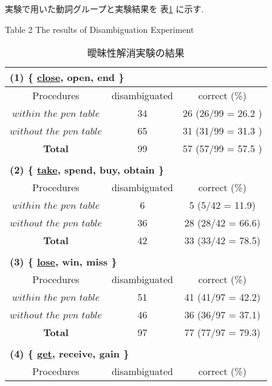 実験で用いた動詞グループと実験結果を 表\ref{disam} に示す.

\vspace*{-0.6cm}
{\footnotesize
\begin{table}[htbp]
\begin{center}
\caption{曖昧性解消実験の結果} \label{disam}
\vspace*{-0.2cm}
Table 2 The results of Disambiguation Experiment \\
\begin{tabular}{c||c|c} 
\multicolumn{3}{l}{\bf{(1) \{ \underline{close}, open, end \}}} \\
\hline \hline
Procedures  &disambiguated &correct (\%)  \\ \hline \hline
$within$ $the$ $pvn$ $table$ &\hspace*{1mm}34  &26 (26/99 = 26.2 ) \\ \hline
$without$ $the$ $pvn$ $table$ &65  &31 (31/99 = 31.3 ) \\ \hline
{\bf Total} &99  &57 (57/99 = 57.5 ) \\ \hline
\multicolumn{3}{c}{} \\
\multicolumn{3}{l}{\bf{(2) \{ \underline{take}, spend, buy, obtain
\}}} \\ \hline \hline
Procedures &disambiguated &correct (\%) \\ \hline \hline
$within$ $the$ $pvn$ $table$  &\hspace*{2mm}6  &5 (5/42 = 11.9) \\ \hline
$without$ $the$ $pvn$ $table$  &36 &28 (28/42 = 66.6)  \\ \hline
{\bf Total}  &42 &33 (33/42 = 78.5)  \\ \hline
\multicolumn{3}{c}{} \\
\multicolumn{3}{l}{\bf{(3) \{ \underline{lose}, win, miss \}}} \\
\hline \hline
Procedures  &disambiguated &correct (\%) \\ \hline \hline
$within$ $the$ $pvn$ $table$  &\hspace*{1mm}51  &41 (41/97 = 42.2) \\ \hline
$without$ $the$ $pvn$ $table$  &46 &36 (36/97 = 37.1)  \\ \hline
{\bf Total} &97  &77 (77/97 = 79.3)  \\ \hline
\multicolumn{3}{c}{} \\
\multicolumn{3}{l}{\bf{(4) \{ \underline{get}, receive, gain \}}} \\
\hline \hline
Procedures  &disambiguated &correct (\%)  \\ \hline \hline

\end{tabular}
\end{center}
\end{table}}

